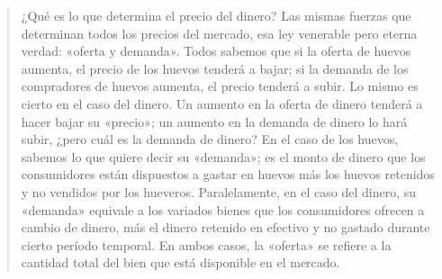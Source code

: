 \documentclass[12pt,a4paper,twoside]{book}
\begin{document}





\begin{quotation}
¿Qué es lo que determina el precio del dinero? Las mismas fuerzas que determinan todos los precios del mercado, esa ley venerable pero eterna verdad: «oferta y demanda». Todos sabemos que si la oferta de huevos aumenta, el precio de los huevos tenderá a bajar; si la demanda de los compradores de huevos aumenta, el precio tenderá a subir. Lo mismo es cierto en el caso del dinero. Un aumento en la oferta de dinero tenderá a hacer bajar su «precio»; un aumento en la demanda de dinero lo hará subir, ¿pero cuál es la demanda de dinero? En el caso de los huevos, sabemos lo que quiere decir su «demanda»; es el monto de dinero que los consumidores están dispuestos a gastar en huevos más los huevos retenidos y no vendidos por los hueveros. Paralelamente, en el caso del dinero, su «demanda» equivale a los variados bienes que los consumidores ofrecen a cambio de dinero, más el dinero retenido en efectivo y no gastado durante cierto período temporal. En ambos casos, la «oferta» se refiere a la cantidad total del bien que está disponible en el mercado. \cite[págs. 22-23]{rothbard:dinero}
\end{quotation}
\end{document}
